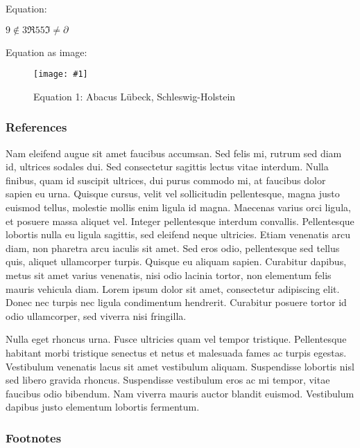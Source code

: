 \documentclass{article}
\newlength{\imgwidth}
\newcommand\scaledgraphics[2]{%
                
\settowidth{\imgwidth}{\texttt{[image: \#1]}}%
                
\setlength{\imgwidth}{\minof{\imgwidth}{#2\textwidth}}%
                
\texttt{[image: \#1]}%
                
}
\begin{document}
Equation:


$9\notin3\mathfrak{\Re }55\mathfrak{\Im }\ne\partial$


Equation as image:

\begin{figure}
\scaledgraphics{c15490e4-8fc0-4e3f-b49c-bbe51655b8d2.jpg}{0.5}
\caption*{Equation 1:  Abacus Lübeck, Schleswig-Holstein}\label{F9394491}
\end{figure}


\subsubsection{References}\label{H7100180}



Nam eleifend augue sit amet faucibus accumsan. Sed felis mi, rutrum sed diam id, ultrices sodales dui. Sed consectetur sagittis lectus vitae interdum. Nulla finibus, quam id suscipit ultrices, dui purus commodo mi, at faucibus dolor sapien eu urna. Quisque cursus, velit vel sollicitudin pellentesque, magna justo euismod tellus, molestie mollis enim ligula id magna.\autocite{https://doi.org/10.15463/rec.799967328} Maecenas varius orci ligula, et posuere massa aliquet vel. Integer pellentesque interdum convallis. Pellentesque lobortis nulla eu ligula sagittis, sed eleifend neque ultricies. Etiam venenatis arcu diam, non pharetra arcu iaculis sit amet. Sed eros odio, pellentesque sed tellus quis, aliquet ullamcorper turpis. Quisque eu aliquam sapien. Curabitur dapibus, metus sit amet varius venenatis, nisi odio lacinia tortor, non elementum felis mauris vehicula diam. Lorem ipsum dolor sit amet, consectetur adipiscing elit. Donec nec turpis nec ligula condimentum hendrerit. Curabitur posuere tortor id odio ullamcorper, sed viverra nisi fringilla.


Nulla eget rhoncus urna. Fusce ultricies quam vel tempor tristique. Pellentesque habitant morbi tristique senectus et netus et malesuada fames ac turpis egestas. Vestibulum venenatis lacus sit amet vestibulum aliquam. Suspendisse lobortis nisl sed libero gravida rhoncus. Suspendisse vestibulum eros ac mi tempor, vitae faucibus odio bibendum. Nam viverra mauris auctor blandit euismod. Vestibulum dapibus justo elementum lobortis fermentum.


\subsubsection{Footnotes}\label{H7237703}
\end{document}
